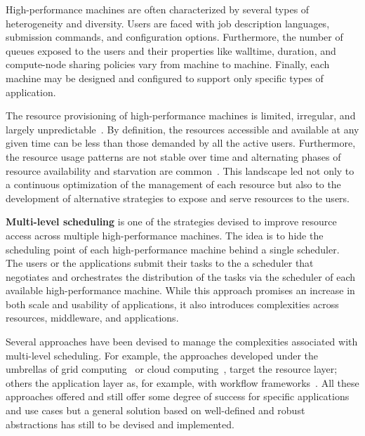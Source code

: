 \documentclass{sig-alternate}
\begin{document}
High-performance machines are often characterized by several types of
heterogeneity and diversity. Users are faced with job description languages,
submission commands, and configuration options. Furthermore, the number of
queues exposed to the users and their properties like walltime, duration, and
compute-node sharing policies vary from machine to machine. Finally, each
machine may be designed and configured to support only specific types of
application.

The resource provisioning of high-performance machines is limited, irregular,
and largely unpredictable~\cite{downey1997,wolski2003,li2004,tsafrir2007}. By
definition, the resources accessible and available at any given time can be less
than those demanded by all the active users. Furthermore, the resource usage
patterns are not stable over time and alternating phases of resource
availability and starvation are common~\cite{Furlani2013,Lu2013}. This landscape
led not only to a continuous optimization of the management of each resource but
also to the development of alternative strategies to expose and serve resources
to the users.


{\bf Multi-level scheduling} is one of the strategies devised to improve
resource access across multiple high-performance machines. The idea is to hide
the scheduling point of each high-performance machine behind a single scheduler.
The users or the applications submit their tasks to the a scheduler that
negotiates and orchestrates the distribution of the tasks via the scheduler of
each available high-performance machine. While this approach promises an
increase in both scale and usability of applications, it also introduces
complexities across resources, middleware, and applications.


Several approaches have been devised to manage the complexities associated with
multi-level scheduling. For example, the approaches developed under the
umbrellas of grid computing~\cite{raicu2007,singh2005,ramakrishnan2006toward} or
cloud computing~\cite{foster2008,juve2008,villegas2012,song2009}, target the
resource layer; others the application layer as, for example, with workflow frameworks~\cite{taylor2014,curcin2008scientific,juve2008,balderrama2012scalable}.
All these approaches offered and still offer some degree of success for specific
applications and use cases but a general solution based on well-defined and
robust abstractions has still to be devised and implemented.
\end{document}
